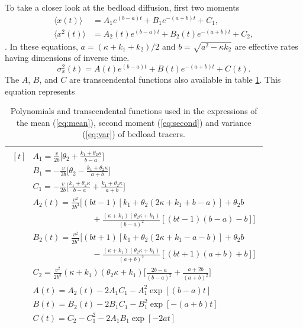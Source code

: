 \documentclass[draft,grl]{agujournal2018}
\newcommand\be{\begin{equation}}
\newcommand\ee{\end{equation}}
\newcommand\bra{\langle}
\newcommand\ket{\rangle}
\begin{document}
To take a closer look at the bedload diffusion,  first two moments 
\begin{align}
\bra x(t) \ket &= A_1 e^{(b-a)t}+B_1e^{-(a+b)t}+C_1, \label{eq:mean}\\
\bra x^2(t) \ket &= A_2(t)e^{(b-a)t}+B_2(t)e^{-(a+b)t}+C_2, \label{eq:second}
\end{align}
. In these equations, $a = (\kappa + k_1+k_2)/2$ and $b = \sqrt{a^2-\kappa k_2}$ are effective rates having dimensions of inverse time.
\be \sigma_x^2(t) = A(t)e^{(b-a)t} + B(t)e^{-(a+b)t} + C(t). \label{eq:var}\ee
The $A$, $B$, and $C$ are transcendental functions also available in table \ref{table:params}.
This equation represents 
\begin{table}[!h]
	\centering
	\caption{Polynomials and transcendental functions used in the expressions of the mean (\ref{eq:mean}), second moment (\ref{eq:second}) and variance (\ref{eq:var}) of bedload tracers.}
	\label{table:params}
	\begin{tabular}{c}
		\toprule
		$\begin{aligned}[t]
		&A_1 = \frac{v}{2b}\big[\theta_2+\frac{k_1+\theta_2\kappa}{b-a}\big] \\
		&B_1 = -\frac{v}{2b}\big[\theta_2-\frac{k_1+\theta_2 \kappa}{a+b}\big] \\
		&C_1 =  -\frac{v}{2b}\big[\frac{k_1+\theta_2 \kappa}{b-a}+\frac{k_1+\theta_2 \kappa}{a+b}\big]\\
		&A_2(t) = \frac{v^2}{2b^3}\Big[(bt-1)[k_1+\theta_2(2\kappa + k_1 + b-a)]+\theta_2b \\
		&\hspace{3cm} + \frac{(\kappa+k_1)(\theta_2\kappa+k_1)}{(b-a)^2}[(bt-1)(b-a)-b]\Big]\\
		&B_2(t) = \frac{v^2}{2b^3}\Big[(bt+1)[k_1 + \theta_2(2\kappa+k_1-a-b)]+\theta_2b\\
		&\hspace{3cm} -\frac{(\kappa+k_1)(\theta_2\kappa+k_1)}{(a+b)^2}[(bt+1)(a+b)+b]\Big]\\
		&C_2 = \frac{v^2}{2b^3}(\kappa+k_1)(\theta_2 \kappa + k_1)\Big[\frac{2b-a}{(b-a)^2}+\frac{a+2b}{(a+b)^2}\Big]\\
		&A(t) = A_2(t)-2A_1C_1 - A_1^2\exp[(b-a)t]\\
		&B(t) = B_2(t)-2B_1C_1 - B_1^2\exp[-(a+b)t]\\
		&C(t) = C_2-C_1^2-2A_1B_1\exp[-2at]\\			
		\end{aligned}$\\
		\bottomrule
	\end{tabular}
\end{table}
\end{document}
